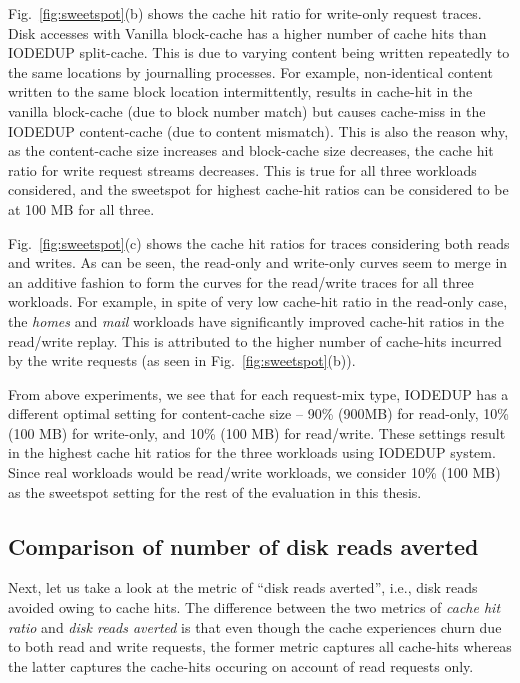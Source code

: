 Fig.~\ref{fig:sweetspot}(b) shows the cache hit ratio for write-only
request traces. Disk accesses with Vanilla block-cache has
a higher number of cache hits than IODEDUP split-cache. 
This is due to varying content being written repeatedly to the same
locations by journalling processes.
For example, non-identical content written to the same block location
intermittently,
results in cache-hit in the vanilla block-cache (due to block number match)
but causes cache-miss in the IODEDUP content-cache (due to content mismatch).
This is also the reason why,
as the content-cache size increases and block-cache size decreases, the
cache hit ratio for write request streams decreases. This is true for
all three workloads considered, and the sweetspot for highest cache-hit
ratios can be considered to be at 100 MB for all three.



Fig.~\ref{fig:sweetspot}(c) shows the cache hit ratios
for traces considering both reads and writes. As can be seen,
the read-only and write-only curves seem to merge in an additive fashion
to form the curves for the read/write traces for all three workloads.
For example, in spite of very low cache-hit ratio in the read-only case,
the \textit{homes} and \textit{mail} workloads have significantly improved
cache-hit ratios in the read/write replay. This is attributed to the
higher number of cache-hits incurred by the write requests (as seen in
Fig.~\ref{fig:sweetspot}(b)).

From above experiments, we see that for each request-mix type, IODEDUP has a
different optimal setting for content-cache size --
90\% (900MB) for read-only,
10\% (100 MB) for write-only, and
10\% (100 MB) for read/write.
These settings result in the highest cache hit
ratios for the three workloads using IODEDUP system. Since real
workloads would be read/write workloads, we consider 10\% (100 MB) as
the sweetspot setting for the rest of the evaluation in this thesis.

\subsection{Comparison of number of disk reads averted}
Next, let us take
a look at the metric of ``disk reads averted'', i.e., disk reads avoided owing
to cache hits. 
The difference between the two metrics of \textit{cache hit
ratio} and 
\textit{disk reads averted} 
is that even though the cache
experiences churn due to both read and write requests, the former metric
captures all cache-hits whereas the latter captures the cache-hits
occuring on account of read requests only.


